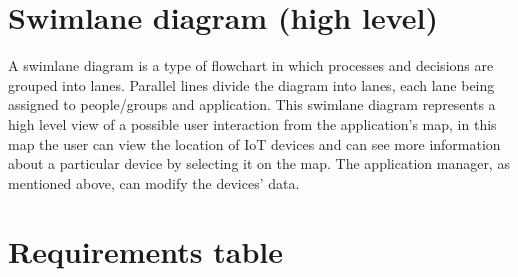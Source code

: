 \documentclass{scrreprt}
\begin{document}
\section{Swimlane diagram (high level)}

A swimlane diagram is a type of flowchart in which processes and decisions
are grouped into lanes. Parallel lines divide the diagram into lanes, each
lane being assigned to people/groups and application.
This swimlane diagram represents a high level view of a possible user interaction
from the application's map, in this map the user can view the location of
IoT devices and can see more information about a particular device by selecting
it on the map. The application manager, as mentioned above, can modify the
devices' data.

\section{Requirements table}
\end{document}
